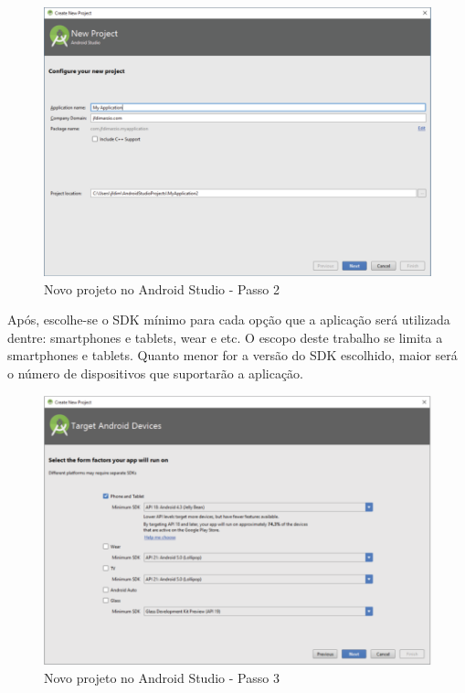 \begin{figure}[H]
    \centering
    \includegraphics[scale=0.65]{images/android_studio_2}
    \caption[Novo projeto no Android Studio - Passo 2]
    {Novo projeto no Android Studio - Passo 2 \cite{DiMarzio2016}}
    \label{fig:android_studio_2}
\end{figure}

Após, escolhe-se o SDK mínimo para cada opção que a aplicação será 
utilizada dentre: smartphones e tablets, wear e etc. O escopo deste trabalho se
limita a smartphones e tablets. Quanto menor for a versão do SDK escolhido,
maior será o número de dispositivos que suportarão a aplicação.

\begin{figure}[H]
    \centering
    \includegraphics[scale=0.65]{images/android_studio_3}
    \caption[Novo projeto no Android Studio - Passo 3]
    {Novo projeto no Android Studio - Passo 3 \cite{DiMarzio2016}}
    \label{fig:android_studio_3}
\end{figure}


